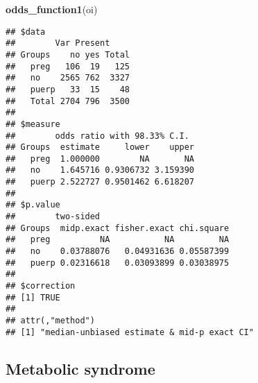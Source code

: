 \documentclass[
]{article}
\newenvironment{Shaded}{\begin{snugshade}}{\end{snugshade}}
\newcommand{\DataTypeTok}[1]{\textcolor[rgb]{0.13,0.29,0.53}{#1}}
\newcommand{\KeywordTok}[1]{\textcolor[rgb]{0.13,0.29,0.53}{\textbf{#1}}}
\newcommand{\NormalTok}[1]{#1}
\newcommand{\OperatorTok}[1]{\textcolor[rgb]{0.81,0.36,0.00}{\textbf{#1}}}
\newcommand{\OtherTok}[1]{\textcolor[rgb]{0.56,0.35,0.01}{#1}}
\newcommand{\StringTok}[1]{\textcolor[rgb]{0.31,0.60,0.02}{#1}}
\begin{document}
\begin{Shaded}
\begin{Highlighting}[]
\KeywordTok{odds_function1}\NormalTok{(oi)}
\end{Highlighting}
\end{Shaded}

\begin{verbatim}
## $data
##        Var Present
## Groups    no yes Total
##   preg   106  19   125
##   no    2565 762  3327
##   puerp   33  15    48
##   Total 2704 796  3500
## 
## $measure
##        odds ratio with 98.33% C.I.
## Groups  estimate     lower    upper
##   preg  1.000000        NA       NA
##   no    1.645716 0.9306732 3.159390
##   puerp 2.522727 0.9501462 6.618207
## 
## $p.value
##        two-sided
## Groups  midp.exact fisher.exact chi.square
##   preg          NA           NA         NA
##   no    0.03788076   0.04931636 0.05587399
##   puerp 0.02316618   0.03093899 0.03038975
## 
## $correction
## [1] TRUE
## 
## attr(,"method")
## [1] "median-unbiased estimate & mid-p exact CI"
\end{verbatim}

\hypertarget{metabolic-syndrome}{%
\subsection{Metabolic syndrome}\label{metabolic-syndrome}}

\begin{Shaded}
\end{Shaded}

\begin{Shaded}
\end{Shaded}
\end{document}
